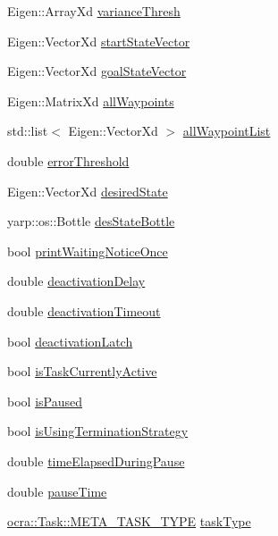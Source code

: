 \begin{DoxyCompactItemize}
\item 
Eigen\+::\+Array\+Xd \hyperlink{classocra__recipes_1_1TrajectoryThread_a63dbf38d082f3ebcebaee867dba2a8ee}{variance\+Thresh}
\item 
Eigen\+::\+Vector\+Xd \hyperlink{classocra__recipes_1_1TrajectoryThread_a28661ee4345695282b2a45baf33bd2af}{start\+State\+Vector}
\item 
Eigen\+::\+Vector\+Xd \hyperlink{classocra__recipes_1_1TrajectoryThread_abb9ba9fef74e7336a325ad1183f4e090}{goal\+State\+Vector}
\item 
Eigen\+::\+Matrix\+Xd \hyperlink{classocra__recipes_1_1TrajectoryThread_a857686d75878a7ae4edf12e37fddb10c}{all\+Waypoints}
\item 
std\+::list$<$ Eigen\+::\+Vector\+Xd $>$ \hyperlink{classocra__recipes_1_1TrajectoryThread_a21821862b17ba40b639c35125611f9d4}{all\+Waypoint\+List}
\item 
double \hyperlink{classocra__recipes_1_1TrajectoryThread_a69ca8ea525dd7529fbeae6d8bb9529b3}{error\+Threshold}
\item 
Eigen\+::\+Vector\+Xd \hyperlink{classocra__recipes_1_1TrajectoryThread_a2f90808ce72fd5a3a5d0b5d576860564}{desired\+State}
\item 
yarp\+::os\+::\+Bottle \hyperlink{classocra__recipes_1_1TrajectoryThread_aae66d09e0f64c124428cebcdb53bdf33}{des\+State\+Bottle}
\item 
bool \hyperlink{classocra__recipes_1_1TrajectoryThread_a4dbc25516ce41a0bc82c49e004a1b933}{print\+Waiting\+Notice\+Once}
\item 
double \hyperlink{classocra__recipes_1_1TrajectoryThread_a98ffdc4593f0608e8355654b54191c21}{deactivation\+Delay}
\item 
double \hyperlink{classocra__recipes_1_1TrajectoryThread_ab4de56a2b92a1887e4d046d7fa70d721}{deactivation\+Timeout}
\item 
bool \hyperlink{classocra__recipes_1_1TrajectoryThread_a5bdb397e0f051c99e563074946e01a82}{deactivation\+Latch}
\item 
bool \hyperlink{classocra__recipes_1_1TrajectoryThread_a7f185a5b52a00b7e5bce78e5ffb77d97}{is\+Task\+Currently\+Active}
\item 
bool \hyperlink{classocra__recipes_1_1TrajectoryThread_a08dc8a4a78b61d6b3d1e38e82b809493}{is\+Paused}
\item 
bool \hyperlink{classocra__recipes_1_1TrajectoryThread_adb4b6cffdd2a797c95b54642e13502d2}{is\+Using\+Termination\+Strategy}
\item 
double \hyperlink{classocra__recipes_1_1TrajectoryThread_a3aa38677a7e98b6a6deec0b29a903844}{time\+Elapsed\+During\+Pause}
\item 
double \hyperlink{classocra__recipes_1_1TrajectoryThread_a9436d523ebb66dfa9bbc8ed458306e46}{pause\+Time}
\item 
\hyperlink{classocra_1_1Task_a8ddf2840d178ca273e886c9ca95248fe}{ocra\+::\+Task\+::\+M\+E\+T\+A\+\_\+\+T\+A\+S\+K\+\_\+\+T\+Y\+PE} \hyperlink{classocra__recipes_1_1TrajectoryThread_a97b08a2471b425e49525b51c9e8eabb4}{task\+Type}
\end{DoxyCompactItemize}


